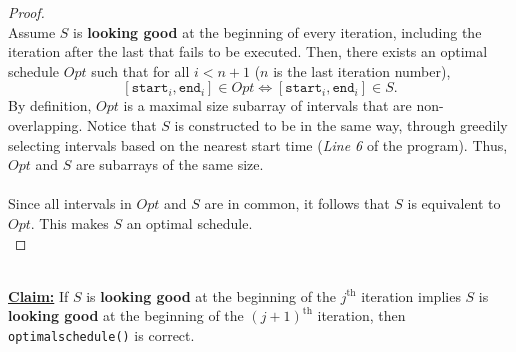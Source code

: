 \documentclass[12pt]{article}
\begin{document}
\begin{proof}
\leavevmode\\
    Assume \( S \) is \textbf{looking good} at the beginning of every iteration, including the iteration after the last that fails to be executed. Then, there exists an optimal schedule \( Opt \) such that for all \( i < n + 1 \) (\( n \) is the last iteration number),
    \[
        [\texttt{start}_i, \texttt{end}_i] \in Opt \iff [\texttt{start}_i, \texttt{end}_i] \in S \text{.}
    \]
    By definition, \( Opt \) is a maximal size subarray of intervals that are non-overlapping. Notice that \( S \) is constructed to be in the same way, through greedily selecting intervals based on the nearest start time (\textit{Line 6} of the program). Thus, \( Opt \) and \( S \) are subarrays of the same size. \\
    \\
    Since all intervals in \( Opt \) and \( S \) are in common, it follows that \( S \) is equivalent to \( Opt \). This makes \( S \) an optimal schedule. \\
\end{proof}
\leavevmode\\
\underline{\textbf{Claim:}} If \( S \) is \textbf{looking good} at the beginning of the \( j^{\text{th}} \) iteration implies \( S \) is \textbf{looking good} at the beginning of the \( (j + 1)^{\text{th}} \) iteration, then \texttt{optimalschedule()} is correct.
\end{document}
